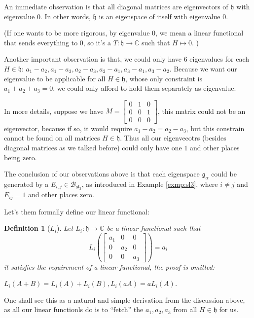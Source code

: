 \documentclass[a4paper]{article}
\newcommand{\C}{\mathbb{C}}
\theoremstyle{bfnote} %
\theoremstyle{bfnote}                  %
\newtheorem{defn}[thm]{Definition}
\theoremstyle{example}                       %
\theoremstyle{remark}                       %
\numberwithin{equation}{section}
\begin{document}
An immediate observation is that all diagonal matrices are eigenvectors of $\mathfrak{h}$ with eigenvalue  $0$. In other words,  $\mathfrak{h}$ is an eigenspace  of itself with eigenvalue $0$.

(If one wants to be more rigorous, by eigenvalue  $0$, we mean a linear functional that sends everything to $0$, so it's a  $T: \mathfrak{h}\to \C$ such that $H \mapsto 0$. )

Another important observation is that, we could only have $6$ eigenvalues for each  $H \in \mathfrak{h}$: $a_1-a_2, a_1-a_3, a_2-a_3, a_2-a_1, a_3-a_1, a_3-a_2$. Because we want our eigenvalue to be applicable for all $H \in \mathfrak{h}$, whose only constraint is $a_1+a_2+a_3 = 0$, we could only afford to hold them separately as eigenvalue.

In more details, suppose we have  $M = \begin{bmatrix} 0 & 1 & 0 \\ 0 & 0 & 1 \\ 0 & 0 &0  \end{bmatrix} $, this matrix could not be an eigenvector, because if so, it would require $a_1 - a_2 = a_2 - a_3$, but this constrain cannot be found on all matrices $H \in \mathfrak{h}$. Thus all our eigenvecotrs (besides diagonal matrices as we talked before) could only have one $1$  and other places being zero.

The conclusion of our observations above is that each eigenspace $\mathfrak{g}_{\alpha}$ could be generated by a $E_{i,j} \in \mathcal{B}_{{\mathfrak{sl}_3}}$, as introduced in Example \ref{exmp:sl3}, where $i \neq j$ and $E_{ij} = 1$ and other places zero.

\bigskip

Let's them formally define our linear functional: 
\begin{defn}[$L_i$]
	Let $L_i: \mathfrak{h} \to \C$ be a linear functional such that \[
		L_i \left(\begin{bmatrix} a_1 & 0 &0 \\ 0 & a_2 & 0 \\ 0 &0 &a_3 \end{bmatrix}\right) = a_i
	\] it satisfies the requirement of a linear functional, the proof is omitted:

	$L_i(A+B) = L_i(A) + L_i(B), L_i(aA) = aL_i(A)$.
\end{defn}
One shall see this as a natural and simple derivation from the discussion above, as all our linear functionls do is to ``fetch'' the $a_1, a_2, a_3$ from all  $H \in \mathfrak{h}$ for us. 
\end{document}
